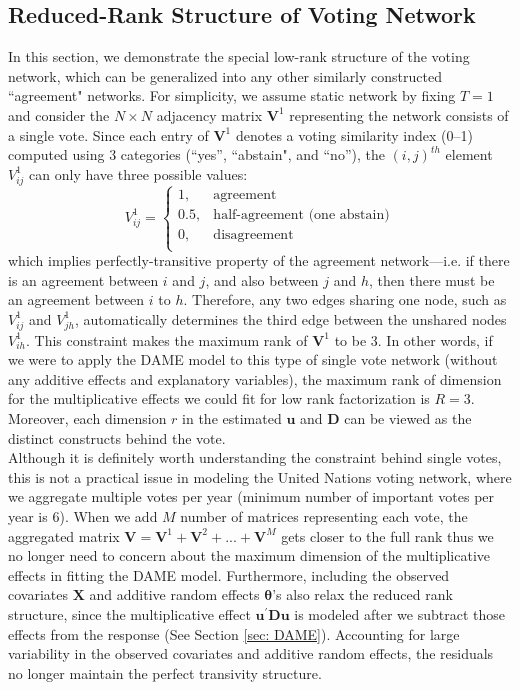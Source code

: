 \documentclass[a4paper]{article}
\begin{document}
\subsection{Reduced-Rank Structure of Voting Network}\label{subsec: reduced rank}
In this section, we demonstrate the special low-rank structure of the voting network, which can be generalized into any other similarly constructed ``agreement" networks. For simplicity, we assume static network by fixing $T = 1$ and consider the $N \times N$ adjacency matrix $\mathbf{V}^1$ representing the network consists of a single vote. Since each entry of $\mathbf{V}^1$ denotes a voting similarity index (0--1) computed using 3 categories (“yes”, ``abstain", and “no”), the $(i, j)^{th}$ element $V^1_{ij}$ can only have three possible values:
\begin{equation*}
V^1_{ij} =\begin{cases}
1, & \mbox{agreement}\\
0.5, &\mbox{half-agreement (one abstain)}\\
0, & \mbox{disagreement}\\
\end{cases}
\end{equation*}
which implies perfectly-transitive property of the agreement network---i.e. if there is an agreement between $i$ and $j$, and also between $j$ and $h$, then there must be an agreement between $i$ to $h$. Therefore, any two edges sharing one node, such as $V^1_{ij}$ and $V^1_{jh}$, automatically determines the third edge between the unshared nodes $V^1_{ih}$. This constraint makes the maximum rank of $\mathbf{V}^1$ to be 3. In other words, if we were to apply the DAME model to this type of single vote network (without any additive effects and explanatory variables), the maximum rank of dimension for the multiplicative effects we could fit for low rank factorization is $R=3$. Moreover, each dimension $r$ in the estimated $\boldsymbol{u}$ and $\mathbf{D}$ can be viewed as the distinct constructs behind the vote. \\ \newline
Although it is definitely worth understanding the constraint behind single votes, this is not a practical issue in modeling the United Nations voting network, where we aggregate multiple votes per year (minimum number of important votes per year is 6). When we add $M$ number of matrices representing each vote, the aggregated matrix $\mathbf{V} = \mathbf{V}^1+\mathbf{V}^2+...+\mathbf{V}^M$ gets closer to the full rank thus we no longer need to concern about the maximum dimension of the multiplicative effects in fitting the DAME model. Furthermore, including the observed covariates $\mathbf{X}$ and additive random effects $\boldsymbol{\theta}$'s also relax the reduced rank structure, since the multiplicative effect $\boldsymbol{u}^\prime \mathbf{D}\boldsymbol{u}$ is modeled after we subtract those effects from the response (See Section \ref{sec: DAME}). Accounting for large variability in the observed covariates and additive random effects, the residuals no longer maintain the perfect transivity structure.
\end{document}
